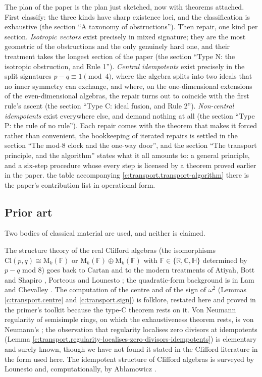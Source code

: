 \documentclass[11pt]{article}
\theoremstyle{definition}
\theoremstyle{plain}
\providecommand{\C}{}\renewcommand{\C}{\mathbb{C}}
\providecommand{\Cl}{}\renewcommand{\Cl}{\mathrm{Cl}}
\providecommand{\HH}{}\renewcommand{\HH}{\mathbb{H}}
\providecommand{\Mat}{}\renewcommand{\Mat}{\mathrm{M}}
\providecommand{\R}{}\renewcommand{\R}{\mathbb{R}}
\begin{document}
The plan of the paper is the plan just sketched, now with theorems attached. First classify: the three kinds have sharp existence loci, and the classification is exhaustive (the section ``A taxonomy of obstructions''). Then repair, one kind per section. \emph{Isotropic vectors} exist precisely in mixed signature; they are the most geometric of the obstructions and the only genuinely hard one, and their treatment takes the longest section of the paper (the section ``Type N: the isotropic obstruction, and Rule 1''). \emph{Central idempotents} exist precisely in the split signatures $p - q \equiv 1 \pmod 4$, where the algebra splits into two ideals that no inner symmetry can exchange, and where, on the one-dimensional extensions of the even-dimensional algebras, the repair turns out to coincide with the first rule's ascent (the section ``Type C: ideal fusion, and Rule 2''). \emph{Non-central idempotents} exist everywhere else, and demand nothing at all (the section ``Type P: the rule of no rule''). Each repair comes with the theorem that makes it forced rather than convenient, the bookkeeping of iterated repairs is settled in the section ``The mod-8 clock and the one-way door'', and the section ``The transport principle, and the algorithm'' states what it all amounts to: a general principle, and a six-step procedure whose every step is licensed by a theorem proved earlier in the paper. the table accompanying \ref{c:transport.transport-algorithm} there is the paper's contribution list in operational form.

\subsection*{Prior art}
\label{c:note.transport.setting-prior-art}
Two bodies of classical material are used, and neither is claimed.

The structure theory of the real Clifford algebras (the isomorphisms $\Cl(p,q) \cong \Mat_k(\mathbb{F})$ or $\Mat_k(\mathbb{F}) \oplus \Mat_k(\mathbb{F})$ with $\mathbb{F} \in \{\R, \C, \HH\}$ determined by $p - q$ mod $8$) goes back to Cartan and to the modern treatments of Atiyah, Bott and Shapiro \cite{ABS1964}, Porteous \cite{Porteous1995} and Lounesto \cite{Lounesto2001}; the quadratic-form background is in Lam \cite{Lam2005} and Chevalley \cite{Chevalley1997}. The computation of the centre and of the sign of $\omega^2$ (Lemmas \ref{c:transport.centre} and \ref{c:transport.sign}) is folklore, restated here and proved in the primer's toolkit \cite[Section 9]{ButlerT0} because the type-C theorem rests on it. Von Neumann regularity of semisimple rings, on which the exhaustiveness theorem rests, is von Neumann's \cite{vonNeumann1936}; the observation that regularity localises zero divisors at idempotents (Lemma \ref{c:transport.regularity-localises-zero-divisors-idempotents}) is elementary and surely known, though we have not found it stated in the Clifford literature in the form used here. The idempotent structure of Clifford algebras is surveyed by Lounesto \cite{Lounesto2001} and, computationally, by Ab{\l}amowicz \cite{Ablamowicz1998}.
\end{document}
